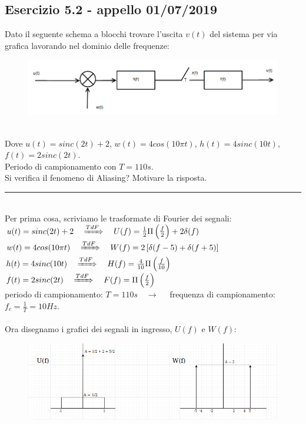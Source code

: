 \documentclass[12pt,a4paper]{article}
\begin{document}
	\subsection*{Esercizio 5.2 - appello 01/07/2019}
	Dato il seguente schema a blocchi trovare l’uscita $v(t)$ del sistema per via grafica lavorando nel dominio delle frequenze:
	\begin{figure}[h!]
		\centering
		\includegraphics[scale=0.4]{./images/fourier21.png}
	\end{figure}
	\\Dove $u(t) = sinc(2t) + 2$, $w(t) = 4cos(10\pi t)$, $h(t) = 4sinc(10t)$, $f(t) = 2sinc(2t)$. \\Periodo di campionamento con $T=110s$.\\Si verifica il fenomeno di Aliasing? Motivare la risposta.
	\par\noindent\rule{\textwidth}{0.4pt}
	\vspace{5mm}
	\\
	Per prima cosa, scriviamo le trasformate di Fourier dei segnali:\\
	$u(t) = sinc(2t) + 2\quad\xRightarrow[]{TdF}\quad U(f) = \frac{1}{2}\Pi\left(\frac{f}{2}\right) + 2\delta(f)$\\
	$w(t) = 4cos(10\pi t)\quad\xRightarrow[]{TdF}\quad W(f) = 2\left[\delta(f-5) + \delta(f+5)\right]$\\
	$h(t) = 4sinc(10t)\quad\xRightarrow[]{TdF}\quad H(f) = \frac{4}{10}\Pi\left(\frac{f}{10}\right)$\\
	$f(t) = 2sinc(2t)\quad\xRightarrow[]{TdF}\quad F(f) = \Pi\left(\frac{f}{2}\right)$\vspace{5px}\\
	periodo di campionamento: $T=110s\quad\rightarrow\quad$ frequenza di campionamento: $f_c = \frac{1}{T} = 10Hz$.\\\\
	Ora disegnamo i grafici dei segnali in ingresso, $U(f)$ e $W(f)$:
	\begin{figure}[h!]
		\centering
		\includegraphics[scale=0.4]{./images/fourier22.png}
	\end{figure}
\end{document}
